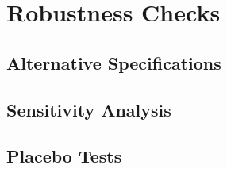 \section{Robustness Checks}

\subsection{Alternative Specifications}
%   

\subsection{Sensitivity Analysis}

\subsection{Placebo Tests}
